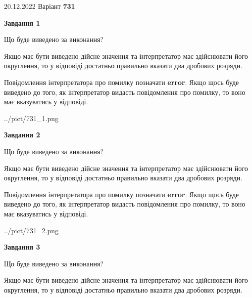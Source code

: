 \documentclass[12pt, ukrainian]{article}
\begin{document}
{20.12.2022 Варіант \No \textbf { 731 }\par}
{
\begin {Large}

{\begin {center}\textbf{Завдання 1}\end {center}}\par
Що буде виведено за виконання? \par

Якщо має бути виведено дійсне значення та інтерпретатор має здійснювати його округлення, 
то у відповіді достатньо правильно вказати два дробових розряди.

Повідомлення інтерпретатора про помилку позначати \textbf{error}.
Якщо щось буде виведено до того, як інтерпретатор видасть повідомлення про помилку, 
то воно має вказуватись у відповіді. \par

\begin{center}
	{../pict/731_1.png}
\end{center}
\newpage

{\begin {center}\textbf{Завдання 2}\end {center}}\par
Що буде виведено за виконання? \par

Якщо має бути виведено дійсне значення та інтерпретатор має здійснювати його округлення, 
то у відповіді достатньо правильно вказати два дробових розряди.

Повідомлення інтерпретатора про помилку позначати \textbf{error}.
Якщо щось буде виведено до того, як інтерпретатор видасть повідомлення про помилку, 
то воно має вказуватись у відповіді. \par

\begin{center}
	{../pict/731_2.png}
\end{center}
\newpage

{\begin {center}\textbf{Завдання 3}\end {center}}\par
Що буде виведено за виконання? \par

Якщо має бути виведено дійсне значення та інтерпретатор має здійснювати його округлення, 
то у відповіді достатньо правильно вказати два дробових розряди.


\end{Large}}
\end{document}
